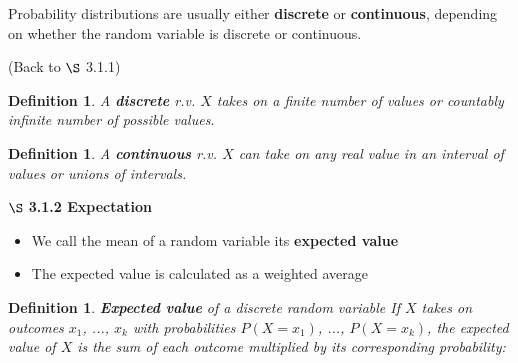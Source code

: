 \documentclass[12pt]{amsart}
\newtheorem{definition}[theorem]{Definition}
\begin{document}
{\vspace{0.5cm}

Probability distributions are usually either \textbf{discrete} or \textbf{continuous}, depending on whether the random variable is discrete or continuous.

\vspace{1cm}

(Back to $\S$ 3.1.1)
\begin{definition} A \textbf{discrete} r.v. $X$ takes on a finite number of values or countably infinite number of possible values.
\end{definition}

\begin{definition} A \textbf{continuous} r.v. $X$ can take on any real value in an interval of values or unions of intervals.\end{definition}


\vspace{2cm}

\newpage

$\S$ \textbf{3.1.2 Expectation}

\vspace{.5cm}

\begin{itemize}
\item We call the mean of a random variable its \textbf{expected value}
\item The expected value is calculated as a weighted average
\end{itemize}

\vspace{.5cm}

\begin{definition}{\textbf{Expected value} of a discrete random variable} \newline
If $X$ takes on outcomes $x_1$, ..., $x_k$ with probabilities $P(X=x_1)$, ..., $P(X=x_k)$, the expected value of $X$ is the sum of each outcome multiplied by its corresponding probability:


\vspace{3cm}


\end{definition}}
\end{document}
